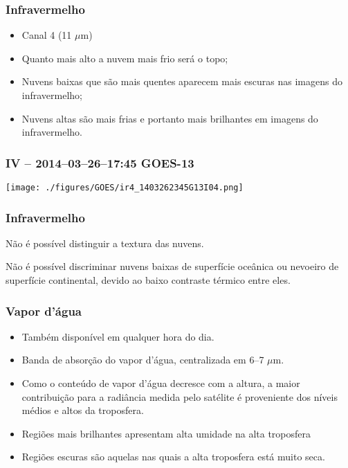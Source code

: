 \begin{frame}
\frametitle{Infravermelho}
  \begin{itemize}[<+-| alert@+>]
    \item Canal 4 (11 $\mu$m)
    \item Quanto mais alto a nuvem mais frio será o topo;
    \item Nuvens baixas que são mais quentes aparecem mais escuras nas imagens
          do infravermelho;
    \item Nuvens altas são mais frias e portanto mais brilhantes em imagens do
          infravermelho.
  \end{itemize}
\end{frame}


\begin{frame}
\frametitle{IV -- 2014--03--26--17:45 GOES-13}
  \begin{center}
    \texttt{[image: ./figures/GOES/ir4\_1403262345G13I04.png]}
  \end{center}
\end{frame}


\begin{frame}
\frametitle{Infravermelho}
  \begin{block}{}
    Não é possível distinguir a textura das nuvens.
  \end{block}
  \pause
  \begin{block}{}
    Não é possível discriminar nuvens baixas de superfície oceânica ou nevoeiro
    de superfície continental, devido ao baixo contraste térmico entre eles.
  \end{block}
\end{frame}


\begin{frame}
\frametitle{Vapor d'água}
  \begin{itemize}[<+-| alert@+>]
    \item Também disponível em qualquer hora do dia.
    \item Banda de absorção do vapor d'água, centralizada em 6--7 $\mu$m.
    \item Como o conteúdo de vapor d'água decresce com a altura, a maior
          contribuição para a radiância medida pelo satélite é proveniente
          dos níveis médios e altos da troposfera.
    \item Regiões mais brilhantes apresentam alta umidade na alta troposfera
    \item Regiões escuras são aquelas nas quais a alta
          troposfera está muito seca.
  \end{itemize}
\end{frame}



